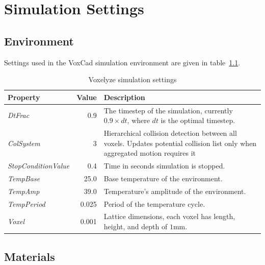 \chapter{Simulation Settings} %
\label{SimulationSettings} %



\section{Environment}
Settings used in the VoxCad simulation environment are given in table~\ref{VoxelyzeSimulationSettings}.

\begin{table}[ht!]
\centering
\caption{Voxelyze simulation settings}
\label{VoxelyzeSimulationSettings}
    \begin{tabular}{l r p{9cm}}
    \toprule
    \textbf{Property} & \textbf{Value} & \textbf{Description}\\
    \midrule
    \emph{DtFrac} & 0.9 & The timestep of the simulation, currently $0.9 \times dt$, where $dt$ is the optimal timestep.\\
    \emph{ColSystem}        & 3 & Hierarchical collision detection between all voxels. Updates potential collision list only when aggregated motion requires it\footnote.\\
    \emph{StopConditionValue} & 0.4 & Time in seconds simulation is stopped.\\
    \emph{TempBase} & 25.0 & Base temperature of the environment.\\
    \emph{TempAmp} & 39.0 & Temperature's amplitude of the environment.\\
    \emph{TempPeriod} & 0.025 & Period of the temperature cycle.\\
    \emph{Voxel} & 0.001 & Lattice dimensions, each voxel has length, height, and depth of $1$mm.\\
    \bottomrule
    \end{tabular}
\end{table}




\section{Materials}

